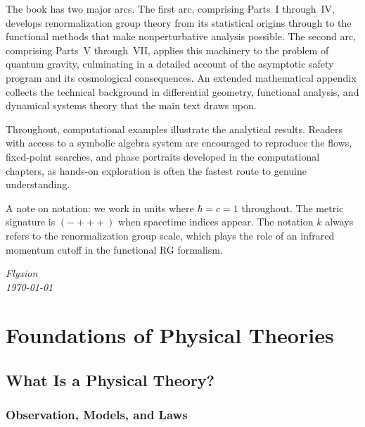 \documentclass[11pt, twoside, openright]{book}
\theoremstyle{dotted}
\theoremstyle{definition}
\begin{document}
The book has two major arcs. The first arc, comprising Parts~I through~IV,
develops renormalization group theory from its statistical origins through to the
functional methods that make nonperturbative analysis possible. The second arc,
comprising Parts~V through~VII, applies this machinery to the problem of quantum
gravity, culminating in a detailed account of the asymptotic safety program and
its cosmological consequences. An extended mathematical appendix collects the
technical background in differential geometry, functional analysis, and dynamical
systems theory that the main text draws upon.

Throughout, computational examples illustrate the analytical results. Readers
with access to a symbolic algebra system are encouraged to reproduce the flows,
fixed-point searches, and phase portraits developed in the computational chapters,
as hands-on exploration is often the fastest route to genuine understanding.

A note on notation: we work in units where $\hbar = c = 1$ throughout. The
metric signature is $({-}{+}{+}{+})$ when spacetime indices appear. The notation
$k$ always refers to the renormalization group scale, which plays the role of an
infrared momentum cutoff in the functional RG formalism.

\bigskip
\noindent\textit{Flyxion}\\
\noindent\textit{\today}

\tableofcontents

\mainmatter

\part{Foundations of Physical Theories}

\chapter{What Is a Physical Theory?}
\label{ch:what_is_theory}

\section{Observation, Models, and Laws}
\end{document}
